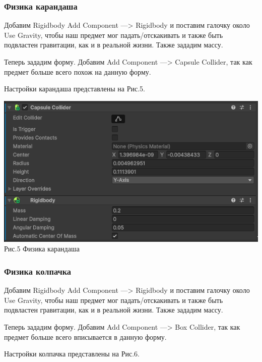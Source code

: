 \documentclass[a4paper,12pt]{article}
\begin{document}
\subsubsection{Физика карандаша}

Добавим Rigidbody Add Component —> Rigidbody и поставим галочку около Use Gravity, чтобы наш предмет мог падать/отскакивать и также быть подвластен гравитации, как и в реальной жизни. Также зададим массу.

Теперь зададим форму. Добавим  Add Component —> Capsule Collider, так как предмет больше всего похож на данную форму.

Настройки карандаша представлены на Рис.5.

\begin{center}
	\includegraphics[scale = 0.5]{5.png}\\
	Рис.5 Физика карандаша
\end{center}

\subsubsection{Физика колпачка}

Добавим Rigidbody Add Component —> Rigidbody и поставим галочку около Use Gravity, чтобы наш предмет мог падать/отскакивать и также быть подвластен гравитации, как и в реальной жизни. Также зададим массу.

Теперь зададим форму. Добавим  Add Component —> Box Collider, так как предмет больше всего вписывается в данную форму. 

Настройки колпачка представлены на Рис.6.
\end{document}

